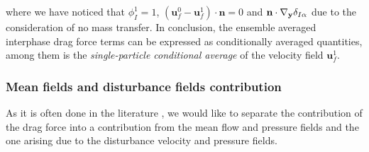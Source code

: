 where we have noticed that $\phi_I^1 = 1$,  $(\textbf{u}_f^0 - \textbf{u}_f^1)\cdot \textbf{n} = 0$ and $\textbf{n} \cdot {\mathbf{\nabla}_\textbf{y}} \delta_{I\alpha}$ due to the consideration of no mass transfer. 
In conclusion, the ensemble averaged interphase drag force terms can be expressed as conditionally averaged quantities, among them is the \textit{single-particle conditional average} of the velocity field $\textbf{u}_f^1$. 


\subsubsection{Mean fields and disturbance fields contribution}

As it is often done in the literature \citep{zhang1994ensemble}, we would like to separate the contribution of the drag force into a contribution from the mean flow and pressure fields and the one arising due to the disturbance velocity and pressure fields.  

